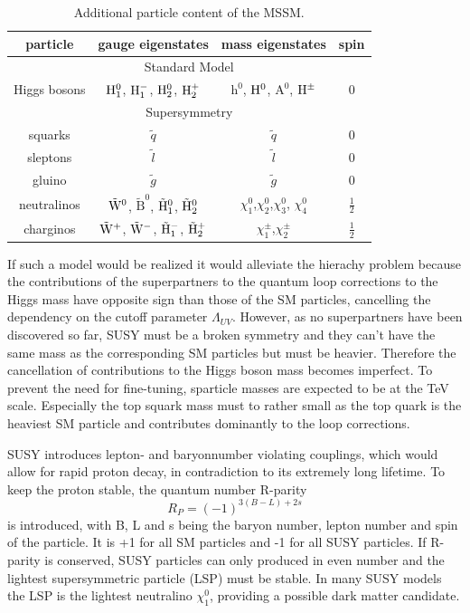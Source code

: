 \begin{table}
\centering
 \renewcommand{\arraystretch}{1.3}
\caption{Additional particle content of the MSSM.}
\label{tab:MSSM}
\begin{tabular}{c|c|c|c}
particle & gauge eigenstates  & mass eigenstates & spin   \\
\hline
\multicolumn{4}{c}{Standard Model} \\
\hline
Higgs bosons & $\mathrm{H}_1^0$, $\mathrm{H}_1^{-}$, $\mathrm{H}_2^0$, $\mathrm{H}_2^+$ & $\mathrm{h}^0$, $\mathrm{H}^0$, $\mathrm{A}^0$, $\mathrm{H}^{\pm}$ & 0 \\
\hline
\multicolumn{4}{c}{Supersymmetry} \\
\hline
squarks & $\tilde{q}$ & $\tilde{q}$ & 0 \\
sleptons & $\tilde{l}$ & $\tilde{l}$ & 0 \\
 gluino & $\tilde{g}$ & $\tilde{g}$ & 0 \\
neutralinos & $\tilde{\mathrm{W}}^0$, $\tilde{\mathrm{B}}^0$, $\tilde{\mathrm{H}}_1^0$, $\tilde{\mathrm{H}}_2^0$ & $\chi^0_1$,$\chi^0_2$,$\chi^0_3$, $\chi^0_4$ & $\frac{1}{2}$\\
charginos & $\tilde{\mathrm{W}}^+$, $\tilde{\mathrm{W}}^-$, $\tilde{\mathrm{H}}_1^-$, $\tilde{\mathrm{H}}_2^+$ & $\chi^{\pm}_1$,$\chi^{\pm}_2$ & $\frac{1}{2}$ \\ 
\end{tabular}
\end{table} 

If such a model would be realized it would alleviate the hierachy problem because the contributions of the superpartners to the quantum loop corrections to the Higgs mass have opposite sign than those of the SM particles, cancelling the dependency on the cutoff parameter $\Lambda_{UV}$. However, as no superpartners have been discovered so far, SUSY must be a broken symmetry and they can't have the same mass as the corresponding SM particles but must be heavier. Therefore the cancellation of contributions to the Higgs boson mass becomes imperfect. To prevent the need for fine-tuning, sparticle masses are expected to be at the TeV scale. Especially the top squark mass must to rather small as the top quark is the heaviest SM particle and contributes dominantly to the loop corrections. 

SUSY introduces lepton- and baryonnumber violating couplings, which would allow for rapid proton decay, in contradiction to its extremely long lifetime. To keep the proton stable, the quantum number R-parity
\begin{equation}
R_P = (-1)^{3(B-L)+2s}
\end{equation} 
is introduced, with B, L and s being the baryon number, lepton number and spin of the particle. It is +1 for all SM particles and -1 for all SUSY particles. If R-parity is conserved, SUSY particles can only produced in even number and the lightest supersymmetric particle (LSP) must be stable. In many SUSY models the LSP is the lightest neutralino $\chi^0_1$, providing a possible dark matter candidate. 


